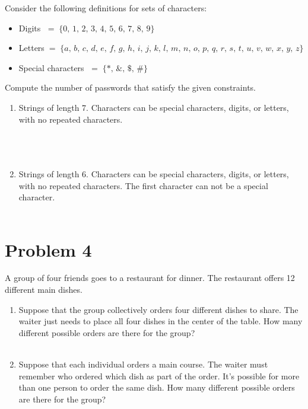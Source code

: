 \documentclass{amsart}
\theoremstyle{definition}
\theoremstyle{Exercise}
\theoremstyle{remark}
\theoremstyle{rule}
\numberwithin{equation}{section}
\begin{document}
   
Consider the following definitions for sets of characters:
\begin{itemize}
  \item Digits $\;=\; \{ 0,\, 1,\, 2,\, 3,\, 4,\, 5,\, 6,\, 7,\, 8,\, 9 \}$\\
  \item Letters$\; = \;\{ a,\, b,\, c, \,d,\, e,\, f,\, g,\, h,\, i,\, j,\, k,\, l,\, m,\, n,\, o,\, p,\, q,\, r,\, s,\, t,\, u,\, v,\, w,\, x,\, y,\, z \}$\\
  \item Special characters $\;=\; \{ *,\, \&,\, \$,\, \# \}$\\
\end{itemize}

Compute the number of passwords that satisfy the given constraints.
    \begin{enumerate}[label=(\roman*)]
    \item Strings of length 7. Characters can be special characters, digits, or letters, with no repeated characters.\\\\
\\\\
    \item Strings of length 6. Characters can be special characters, digits, or letters, with no repeated characters. The first character can not be a special character.\\\\
      \end{enumerate}
 \newpage

\section*{Problem 4}
A group of four friends goes to a restaurant for dinner. The restaurant offers 12 different main dishes.\\
    \begin{enumerate}[label=(\roman*)]
    \item Suppose that the group collectively orders four different dishes to share. The waiter just needs to place all four dishes in the center of the table. How many different possible orders are there for the group?\\\\
    \item Suppose that each individual orders a main course. The waiter must remember who ordered which dish as part of the order. It's possible for more than one person to order the same dish. How many different possible orders are there for the group?\\\\
\\\\

    \end{enumerate}
\end{document}
